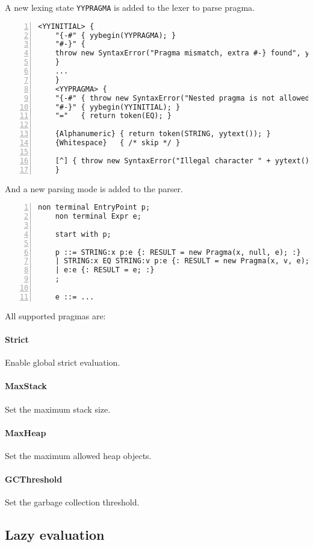 \documentclass[a4paper]{article}
\begin{document}
A new lexing state \texttt{YYPRAGMA} is added to the lexer to parse pragma.

\begin{Verbatim}[numbers=left]
    <YYINITIAL> {
    "{-#" { yybegin(YYPRAGMA); }
    "#-}" {
    throw new SyntaxError("Pragma mismatch, extra #-} found", yyline, yycolumn);
    }
    ...
    }
    <YYPRAGMA> {
    "{-#" { throw new SyntaxError("Nested pragma is not allowed", yyline, yycolumn); }
    "#-}" { yybegin(YYINITIAL); }
    "="   { return token(EQ); }

    {Alphanumeric} { return token(STRING, yytext()); }
    {Whitespace}   { /* skip */ }

    [^] { throw new SyntaxError("Illegal character " + yytext(), yyline, yycolumn); }
    }
\end{Verbatim}

And a new parsing mode is added to the parser.

\begin{Verbatim}[numbers=left]
    non terminal EntryPoint p;
    non terminal Expr e;

    start with p;

    p ::= STRING:x p:e {: RESULT = new Pragma(x, null, e); :}
    | STRING:x EQ STRING:v p:e {: RESULT = new Pragma(x, v, e); :}
    | e:e {: RESULT = e; :}
    ;

    e ::= ...
\end{Verbatim}

All supported pragmas are:

\paragraph{Strict} Enable global strict evaluation.
\paragraph{MaxStack} Set the maximum stack size.
\paragraph{MaxHeap} Set the maximum allowed heap objects.
\paragraph{GCThreshold} Set the garbage collection threshold.

\subsection{Lazy evaluation}
\end{document}
